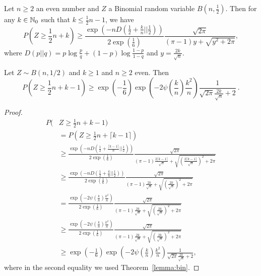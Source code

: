 \documentclass{article} %
\begin{document}
\begin{theorem}
\label{lemma:bin}
Let $n\geq2$ an even number and $Z$ a Binomial random variable $B(n,\frac{1}{2})$. Then for any $k \in \mathbb{N}_0$ such that $k\leq \frac{1}{2}n-1$, we have
\[
P\left( Z \geq \frac{1}{2} n + k\right) 
\geq  \frac{\exp\left(-n D(\frac{1}{2}+\frac{k}{n}||\frac{1}{2})\right)}{2 \exp\left(\frac{1}{6}\right)} \frac{\sqrt{2 \pi}}{(\pi-1)y+\sqrt{y^2+2 \pi}},
\]
where $D(p||q)=p \log \frac{p}{q}+(1-p) \log\frac{1-p}{1-q}$ and $y=\frac{2 k}{\sqrt{n}}$.
\end{theorem}
%
\begin{cor}
Let $Z \sim B(n, 1/2)$ and $k \geq 1$ and $n\geq2$ even. Then
\[
P(Z \geq \frac{1}{2} n + k-1) \geq \exp\left(-\frac{1}{6}\right) \exp\left(- 2 \psi\left(\frac{k}{n}\right) \frac{k^2}{n} \right) \frac{1}{\sqrt{2\pi} \frac{2 k}{\sqrt{n}} + 2 }~.
\]
\end{cor}
\begin{proof}
\begin{align*}
P(&Z \geq  \frac{1}{2} n + k-1) \\
& = P(Z\geq \frac{1}{2} n + \lceil k -1\rceil) \\
& \geq \frac{\exp\left(-n D(\frac{1}{2}+\frac{\lceil k -1\rceil}{n}||\frac{1}{2})\right)}{2 \exp\left(\frac{1}{6}\right)} \frac{\sqrt{2 \pi}}{(\pi-1)\frac{2\lceil k -1\rceil}{\sqrt{n}}+\sqrt{\left(\frac{2\lceil k -1\rceil}{\sqrt{n}}\right)^2+2 \pi}} \\
& \geq \frac{\exp\left(-n D(\frac{1}{2}+\frac{k}{n}||\frac{1}{2})\right)}{2 \exp\left(\frac{1}{6}\right)} \frac{\sqrt{2 \pi}}{(\pi-1)\frac{2k}{\sqrt{n}}+\sqrt{\left(\frac{2k}{\sqrt{n}}\right)^2+2 \pi}} \\
& = \frac{\exp\left(- 2 \psi(\frac{k}{n}) \frac{k^2}{n} \right)}{2 \exp\left(\frac{1}{6}\right)} \frac{\sqrt{2 \pi}}{(\pi-1)\frac{2k}{\sqrt{n}}+\sqrt{\left(\frac{2k}{\sqrt{n}}\right)^2+2 \pi}} \\
& \geq \frac{\exp\left(- 2 \psi(\frac{k}{n}) \frac{k^2}{n} \right)}{2 \exp\left(\frac{1}{6}\right)} \frac{\sqrt{2 \pi}}{(\pi-1)\frac{2k}{\sqrt{n}}+\sqrt{\left(\frac{2k}{\sqrt{n}}\right)^2+2 \pi}} \\
& \geq \exp\left(-\frac{1}{6}\right) \exp\left(- 2 \psi\left(\frac{k}{n}\right) \frac{k^2}{n} \right) \frac{1}{\sqrt{2\pi} \frac{2 k}{\sqrt{n}} + 2 },
\end{align*}
where in the second equality we used Theorem~\ref{lemma:bin}.
\end{proof}
\end{document}
